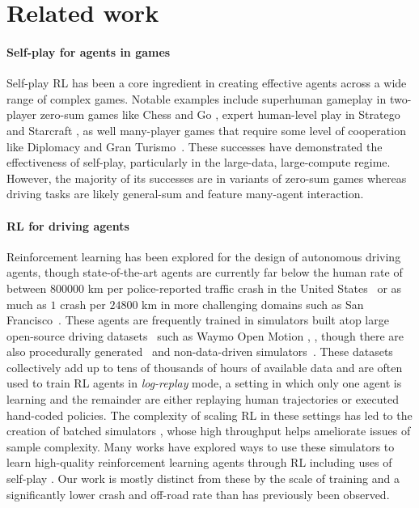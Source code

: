 \section{Related work}
\paragraph{Self-play for agents in games}
Self-play RL \cite{5392560, tesauro1995temporal} has been a core ingredient in creating effective agents across a wide range of complex games. Notable examples include superhuman gameplay in two-player zero-sum games like Chess and Go \cite{silver2018general}, expert human-level play in Stratego \cite{perolat2022mastering} and Starcraft \cite{starcraft}, as well many-player games that require some level of cooperation like Diplomacy \cite{DBLP:conf/iclr/Bakhtin0LGJFMB23} and Gran Turismo~\cite{gtsophy}. These successes have demonstrated the effectiveness of self-play, particularly in the large-data, large-compute regime. However, the majority of its successes are in variants of zero-sum games whereas driving tasks are likely general-sum and feature many-agent interaction.

\paragraph{RL for driving agents}
Reinforcement learning has been explored for the design of autonomous driving agents, though state-of-the-art agents are currently far below the human rate of between $800000$ km per police-reported traffic crash in the United States~\cite{stewart2023overview} or as much as $1$ crash per $24800$ km in more challenging domains such as San Francisco~\cite{flannagan2023establishing}. These agents are frequently trained in simulators built atop large open-source driving datasets~\cite{gulino2024waymax,nocturne,kazemkhani2024gpudrive} such as Waymo Open Motion \citep[WOMD]{ettinger2021large}, \citep[NuScenes]{caesar2020nuscenes}, \citep[ONE-Drive]{onedrive} though there are also procedurally generated~\cite{li2022metadrive} and non-data-driven simulators~\cite{carla17}. These datasets collectively add up to tens of thousands of hours of available data and are often used to train RL agents in \emph{log-replay} mode, a setting in which only one agent is learning and the remainder are either replaying human trajectories or executed hand-coded policies. The complexity of scaling RL in these settings has led to the creation of batched simulators \citep[GPUDrive]{kazemkhani2024gpudrive}, \citep[Waymax]{gulino2024waymax} whose high throughput helps ameliorate issues of sample complexity. Many works have explored ways to use these simulators to learn high-quality reinforcement learning agents through RL including uses of self-play \cite{copo,nocturne,closed_loop_driving,closed_loop_v2,aspDrive}. Our work is mostly distinct from these by the scale of training and a significantly lower crash and off-road rate than has previously been observed. 


